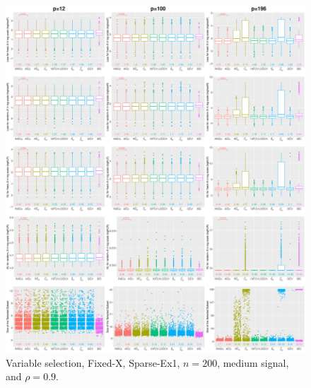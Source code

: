 \begin{figure}[!ht]
\centering
\includegraphics[width=\textwidth]{figures/supplement/fixedx/subset_selection/Sparse-Ex1_n200_msnr_rho09.eps}
\caption{Variable selection, Fixed-X, Sparse-Ex1, $n=200$, medium signal, and $\rho=0.9$.}
\end{figure}
\clearpage
